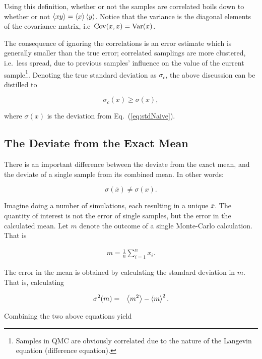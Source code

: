 Using this definition, whether or not the samples are correlated boils down to whether or not $\left< xy \right> = \left< x \right>\left< y \right>$. Notice that the variance is the diagonal elements of the covariance matrix, i.e~$\mathrm{Cov}(x,x) = \mathrm{Var}(x)$.

The consequence of ignoring the correlations is an error estimate which is generally smaller than the true error; correlated samplings are more clustered, i.e.~less spread, due to previous samples' influence on the value of the current sample\footnote{Samples in QMC are obviously correlated due to the nature of the Langevin equation (difference equation).}. Denoting the true standard deviation as $\sigma_c$, the above discussion can be distilled to

\begin{equation}
 \label{eq:trueVsNaiveSTD}
 \sigma_c(x) \ge \sigma(x),
\end{equation}

where $\sigma(x)$ is the deviation from Eq.~(\ref{eq:stdNaive}). 


\subsection{The Deviate from the Exact Mean}

There is an important difference between the deviate from the exact mean, and the deviate of a single sample from its combined mean. In other words:

\begin{equation}
 \sigma(\overline{x}) \ne \sigma(x).
\end{equation}

Imagine doing a number of simulations, each resulting in a unique $\overline{x}$. The quantity of interest is not the error of single samples, but the error in the calculated mean. Let $m$ denote the outcome of a single Monte-Carlo calculation. That is

\begin{eqnarray}
 m = \frac{1}{n}\sum_{i=1}^n x_i. \label{eq:meanx}
 \end{eqnarray}

 The error in the mean is obtained by calculating the standard deviation in $m$. That is, calculating
 
 \begin{eqnarray}
 \sigma^2(m) &=& \left< m^2 \right> - \left< m \right>^2. \label{eq:sigma_m}
\end{eqnarray}

Combining the two above equations yield

